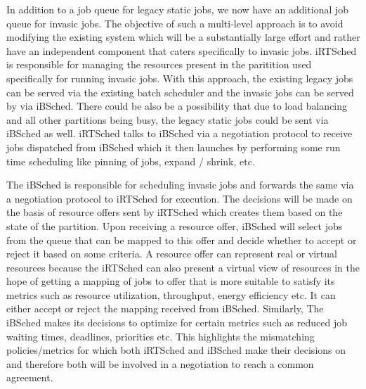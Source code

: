 In addition to a job queue for legacy static jobs, we now have an additional job queue for invasic jobs. The objective of such a multi-level approach is to avoid modifying the existing system which will be a substantially large effort and rather have an independent component that caters specifically to invasic jobs. iRTSched is responsible for managing the resources present in the paritition used specifically for running invasic jobs. With this approach, the existing legacy jobs can be served via the existing batch scheduler and the invasic jobs can be served by via iBSched. There could be also be a possibility that due to load balancing and all other partitions being busy, the legacy static jobs could be sent via iBSched as well. iRTSched talks to iBSched via a negotiation protocol to receive jobs dispatched from iBSched which it then launches by performing some run time scheduling like pinning of jobs, expand / shrink, etc.\\ \par
\noindent
The iBSched is responsible for scheduling invasic jobs and forwards the same via a negotiation protocol to iRTSched for execution. The decisions will be made on the basis of resource offers sent by iRTSched which creates them based on the state of the partition. Upon receiving a resource offer, iBSched will select jobs from the queue that can be mapped to this offer and decide whether to accept or reject it based on some criteria. A resource offer can represent real or virtual resources because the iRTSched can also present a virtual view of resources in the hope of getting a mapping of jobs to offer that is more suitable to satisfy its metrics such as resource utilization, throughput, energy efficiency etc. It can either accept or reject the mapping received from iBSched. Similarly, The iBSched makes its decisions to optimize for certain metrics such as reduced job waiting times, deadlines, priorities etc. This highlights the mismatching policies/metrics for which both iRTSched and iBSched make their decisions on and therefore both will be involved in a negotiation to reach a common agreement.
